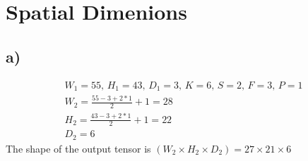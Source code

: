 \documentclass[]{article}
\begin{document}
\section{Spatial Dimenions}
\subsection*{a)}
\begin{align*}
W_1 = 55,\, H_1 = 43,\, D_1 = 3,\, K = 6,\, S = 2,\, F  = 3,\, P = 1 \\
W_2 = \frac{55 - 3 + 2*1}{2} + 1 = 28 \\
H_2 = \frac{43 - 3 + 2*1}{2} + 1 = 22 \\
D_2 = 6
\end{align*}
The shape of the output tensor is $(W_2 \times H_2 \times D_2) = 27 \times 21 \times 6$
\end{document}
